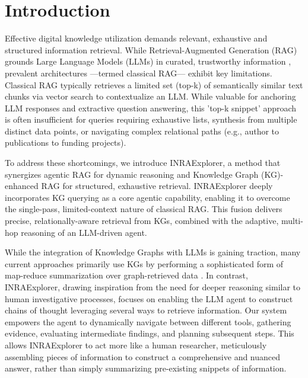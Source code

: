 \documentclass{ecai}
\begin{document}
\section{Introduction}

Effective digital knowledge utilization demands relevant, exhaustive and structured information retrieval. While Retrieval-Augmented Generation (RAG) grounds Large Language Models (LLMs) in curated, trustworthy information \citep{lewis2020retrieval}, prevalent architectures —termed classical RAG— exhibit key limitations. Classical RAG typically retrieves a limited set (top-k) of semantically similar text chunks via vector search \citep{karpukhin2020dense, gunther2023jina} to contextualize an LLM. While valuable for anchoring LLM responses and extractive question answering, this 'top-k snippet' approach is often insufficient for queries requiring exhaustive lists, synthesis from multiple distinct data points, or navigating complex relational paths (e.g., author to publications to funding projects).

To address these shortcomings, we introduce INRAExplorer, a method that synergizes agentic RAG \citep{singh2025agenticsurvey} for dynamic reasoning and Knowledge Graph (KG)-enhanced RAG \citep{zhang2025surveygraphrag, zhu2025knowledgegraphguidedrag} for structured, exhaustive retrieval. INRAExplorer deeply incorporates KG querying as a core agentic capability, enabling it to overcome the single-pass, limited-context nature of classical RAG. This fusion delivers precise, relationally-aware retrieval from KGs, combined with the adaptive, multi-hop reasoning of an LLM-driven agent.

While the integration of Knowledge Graphs with LLMs is gaining traction, many current approaches primarily use KGs by performing a sophisticated form of map-reduce summarization over graph-retrieved data \citep{edge2024graphrag}. In contrast, INRAExplorer, drawing inspiration from the need for deeper reasoning similar to human investigative processes, focuses on enabling the LLM agent to construct chains of thought leveraging several ways to retrieve information. Our system empowers the agent to dynamically navigate between different tools, gathering evidence, evaluating intermediate findings, and planning subsequent steps. This allows INRAExplorer to act more like a human researcher, meticulously assembling pieces of information to construct a comprehensive and nuanced answer, rather than simply summarizing pre-existing snippets of information.
\end{document}
